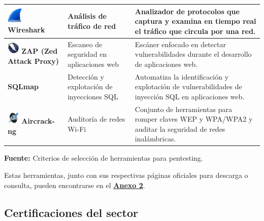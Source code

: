 \documentclass[a4paper, 11pt]{article}
\begin{document}
\begin{table}[H]
\begin{tabular}{|m{5cm}|m{3.5cm}|m{7cm}|}
    \hline
    \includegraphics[width=0.75cm]{images/wireshark.png} \textbf{Wireshark} & Análisis de tráfico de red & Analizador de protocolos que captura y examina en tiempo real el tráfico que circula por una red. \\
    \hline
    \includegraphics[width=0.6cm]{images/zap.jpeg} \textbf{ZAP (Zed Attack Proxy)} & Escaneo de seguridad en aplicaciones web & Escáner enfocado en detectar vulnerabilidades durante el desarrollo de aplicaciones web. \\
    \hline
    \textbf{SQLmap} & Detección y explotación de inyecciones SQL & Automatiza la identificación y explotación de vulnerabilidades de inyección SQL en aplicaciones web. \\
    \hline
    \includegraphics[width=0.6cm]{images/aircrack.jpeg} \textbf{Aircrack-ng} & Auditoría de redes Wi-Fi & Conjunto de herramientas para romper claves WEP y WPA/WPA2 y auditar la seguridad de redes inalámbricas. \\
    \hline
\end{tabular}
\begin{flushleft}\centering
    \footnotesize \textbf{Fuente:} Criterios de selección de herramientas para pentesting. \cite{felipe2024}
\end{flushleft}
\end{table}

Estas herramientas, junto con sus respectivas páginas oficiales para descarga o consulta, pueden encontrarse en el \hyperref[anexo:2]{\textbf{Anexo 2}}.


\subsection{Certificaciones del sector}
\end{document}
